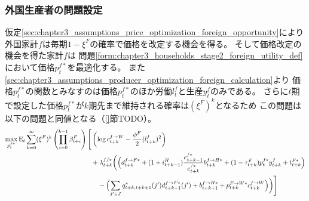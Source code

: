 \subsubsection{外国生産者の問題設定}
\label{sec:chapter3_producers_problem_setup_foreign}
仮定\ref{sec:chapter3_assumptions_price_optimization_foreign_opportunity}により
外国家計\(f\)は毎期\(1-\xi^F\)の確率で価格を改定する機会を得る。
そして価格改定の機会を得た家計\(f\)は
問題\ref{form:chapter3_households_stage2_foreign_utility_def}において価格\(p_t^{f*}\)を最適化する。
また\ref{sec:chapter3_assumptions_producer_optimization_foreign_calculation}より
価格\(p_t^{f*}\)の関数とみなすのは価格\(p_t^{f*}\)のほか労働\(l_t^f\)と生産\(y_t^f\)のみである。
さらに\(t\)期で設定した価格\(p_t^{f*}\)が\(k\)期先まで維持される確率は\((\xi^F)^k\)となるため
この問題は以下の問題と同値となる（\ref{}節TODO）。
\begin{equation}
\label{form:chapter3_producers_problem_setup_foreign_lagrangian_def}
    \begin{aligned}
        \max_{p_t^{f*}}\operatorname{E}_t\sum_{k=0}^{\infty}(\xi^F)^k\left(\prod_{i=0}^{k-1}\beta_{t+i}^F\right)\Biggl[&\left(\log c_{t+k}^{f\to W}-\frac{\phi^F}{2}(l_{t+k}^f)^2\right) \\
        &+\lambda_{t+k}^{f/*}\biggl(\Bigl(d_{t+k}^{f\to F*}+(1+i_{t+k-1}^H)\frac{e_{t+k-1}^{/*}}{e_{t+k}^{/*}}b_{t+k}^{f\to H*}+(1-\tau_{t+k}^F)p_t^{f*}y_{t+k}^f+t_{t+k}^{F*}\Bigr) \\
        &\quad-\Bigl(\sum_{j'\in J}q_{t+k,t+k+1}^*(j')d_{t+k+1}^{f\to F*}(j')+b_{t+k+1}^{f\to H*}+p_{t+k}^{F\to W*}c_{t+k}^{f\to W}\Bigr)\biggr)\Biggr]
    \end{aligned}
\end{equation}